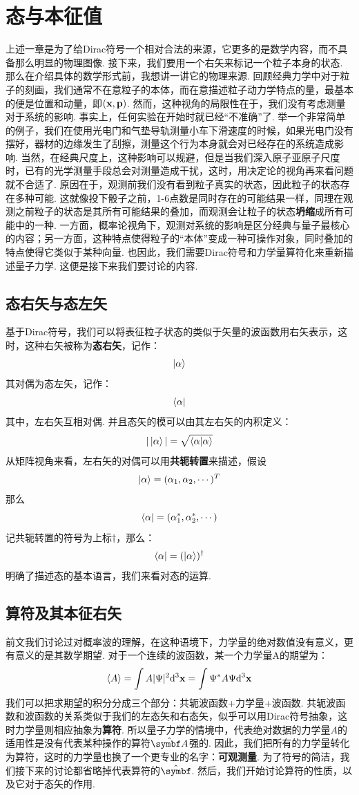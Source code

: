 \section{态与本征值}
上述一章是为了给Dirac符号一个相对合法的来源，它更多的是数学内容，而不具备那么明显的物理图像. 接下来，我们要用一个右矢来标记一个粒子本身的状态. 那么在介绍具体的数学形式前，我想讲一讲它的物理来源. 回顾经典力学中对于粒子的刻画，我们通常不在意粒子的本体，而在意描述粒子动力学特点的量，最基本的便是位置和动量，即\(\left({\mathbf{x},\mathbf{p}}\right)\). 然而，这种视角的局限性在于，我们没有考虑测量对于系统的影响. 事实上，任何实验在开始时就已经“不准确”了. 举一个非常简单的例子，我们在使用光电门和气垫导轨测量小车下滑速度的时候，如果光电门没有摆好，器材的边缘发生了刮擦，测量这个行为本身就会对已经存在的系统造成影响. 当然，在经典尺度上，这种影响可以规避，但是当我们深入原子亚原子尺度时，已有的光学测量手段总会对测量造成干扰，这时，用决定论的视角再来看问题就不合适了. 原因在于，观测前我们没有看到粒子真实的状态，因此粒子的状态存在多种可能. 这就像投下骰子之前，1-6点数是同时存在的可能结果一样，同理在观测之前粒子的状态是其所有可能结果的叠加，而观测会让粒子的状态\textbf{坍缩}成所有可能中的一种. 一方面，概率论视角下，观测对系统的影响是区分经典与量子最核心的内容；另一方面，这种特点使得粒子的“本体”变成一种可操作对象，同时叠加的特点使得它类似于某种向量. 也因此，我们需要Dirac符号和力学量算符化来重新描述量子力学. 这便是接下来我们要讨论的内容. 
\subsection{态右矢与态左矢}
基于Dirac符号，我们可以将表征粒子状态的类似于矢量的波函数用右矢表示，这时，这种右矢被称为\textbf{态右矢}，记作：
\[
\ket{\alpha}
\]
其对偶为态左矢，记作：
\[
\bra{\alpha}
\]
其中，左右矢互相对偶. 并且态矢的模可以由其左右矢的内积定义：
\[
|\ket{\alpha}| = \sqrt{\bra{\alpha}\ket{\alpha}}
\]
从矩阵视角来看，左右矢的对偶可以用\textbf{共轭转置}来描述，假设
\[
\ket{\alpha} = (\alpha_{1},\alpha_{2},\cdots)^{T}
\]
那么
\[
\bra{\alpha} = (\alpha^{*}_{1}, \alpha^{*}_{2},\cdots)
\]
记共轭转置的符号为上标\(\dagger\)，那么：
\[
\bra{\alpha} = (\ket{\alpha})^{\dagger}
\]
明确了描述态的基本语言，我们来看对态的运算. 
\subsection{算符及其本征右矢}
前文我们讨论过对概率波的理解，在这种语境下，力学量的绝对数值没有意义，更有意义的是其数学期望. 对于一个连续的波函数，某一个力学量A的期望为：
\[
\left\langle{A}\right\rangle = \int A|\Psi|^{2}\dd^{3}{\mathbf{x}} = \int\Psi^{*}A\Psi\dd^3\mathbf{x}
\]
我们可以把求期望的积分分成三个部分：共轭波函数+力学量+波函数. 共轭波函数和波函数的关系类似于我们的左态矢和右态矢，似乎可以用Dirac符号抽象，这时力学量则相应抽象为\textbf{算符}. 所以量子力学的情境中，代表绝对数据的力学量\(A\)的适用性是没有代表某种操作的算符\(\uv{A}\)强的. 因此，我们把所有的力学量转化为算符，这时的力学量也换了一个更专业的名字：\textbf{可观测量}. 为了符号的简洁，我们接下来的讨论都省略掉代表算符的\(\uv{}\). 然后，我们开始讨论算符的性质，以及它对于态矢的作用. 
